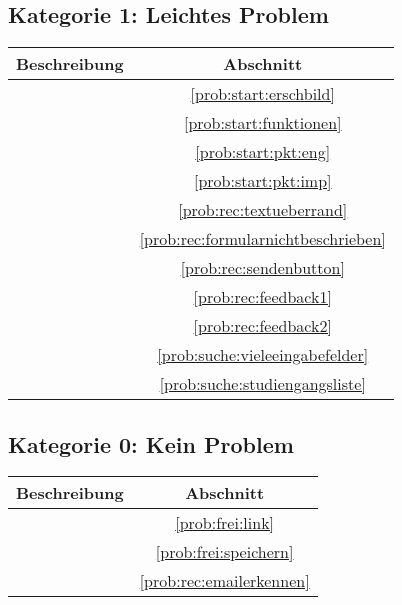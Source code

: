 \subsection*{Kategorie 1: Leichtes Problem}
\begin{tabular}{|p{12cm}|c|}
\hline
\textbf{Beschreibung} & \textbf{Abschnitt} \\
\hline\hline
\nameref{prob:start:erschbild} & \ref{prob:start:erschbild}\\
\nameref{prob:start:funktionen} & \ref{prob:start:funktionen}\\
\nameref{prob:start:pkt:eng} & \ref{prob:start:pkt:eng}\\
\nameref{prob:start:pkt:imp} & \ref{prob:start:pkt:imp}\\
\nameref{prob:rec:textueberrand} & \ref{prob:rec:textueberrand}\\
\nameref{prob:rec:formularnichtbeschrieben} & \ref{prob:rec:formularnichtbeschrieben}\\
\nameref{prob:rec:sendenbutton} & \ref{prob:rec:sendenbutton}\\
\nameref{prob:rec:feedback1} & \ref{prob:rec:feedback1}\\
\nameref{prob:rec:feedback2} & \ref{prob:rec:feedback2}\\
\nameref{prob:suche:vieleeingabefelder} & \ref{prob:suche:vieleeingabefelder}\\
\nameref{prob:suche:studiengangsliste} & \ref{prob:suche:studiengangsliste}\\
\hline
\end{tabular}

\subsection*{Kategorie 0: Kein Problem}
\begin{tabular}{|p{12cm}|c|}
\hline
\textbf{Beschreibung} & \textbf{Abschnitt} \\
\hline\hline
\nameref{prob:frei:link} & \ref{prob:frei:link}\\
\nameref{prob:frei:speichern} & \ref{prob:frei:speichern}\\
\nameref{prob:rec:emailerkennen} & \ref{prob:rec:emailerkennen}\\
\hline
\end{tabular}
